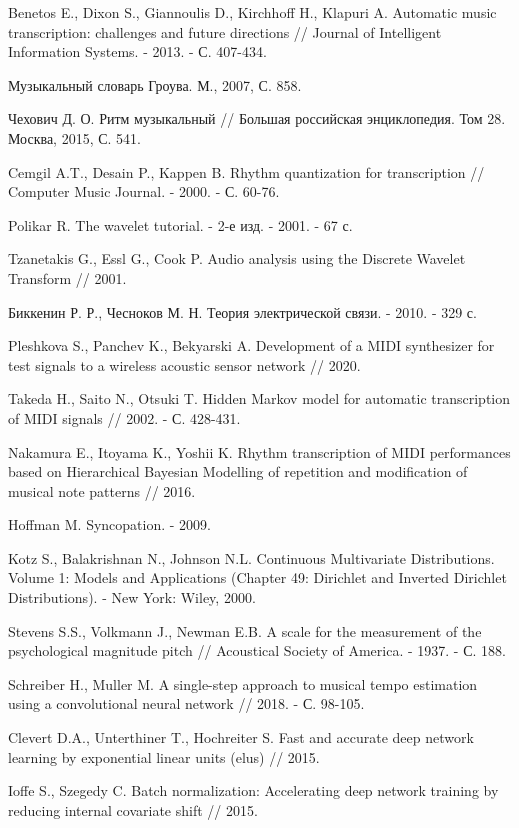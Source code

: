 
\begingroup
\renewcommand{\section}[2]{}
\begin{thebibliography}{}
	
Benetos E., Dixon S., Giannoulis D., Kirchhoff H., Klapuri A. Automatic music transcription: challenges and future directions // Journal of Intelligent Information Systems. - 2013. - С. 407-434.

Музыкальный словарь Гроува. М., 2007, С. 858.

Чехович Д. О. Ритм музыкальный // Большая российская энциклопедия. Том 28. Москва, 2015, С. 541.

Cemgil A.T., Desain P., Kappen B. Rhythm quantization for transcription // Computer Music Journal. - 2000. - С. 60-76.

Polikar R. The wavelet tutorial. - 2-е изд. - 2001. - 67 с.

Tzanetakis G., Essl G., Cook P. Audio analysis using the Discrete Wavelet Transform // 2001.

Биккенин Р. Р., Чесноков М. Н. Теория электрической связи. - 2010. - 329 с.

Pleshkova S., Panchev K., Bekyarski A. Development of a MIDI synthesizer for test signals to a wireless acoustic sensor network // 2020.

Takeda H., Saito N., Otsuki T. Hidden Markov model for automatic transcription of MIDI signals // 2002. - С. 428-431.

Nakamura E., Itoyama K., Yoshii K. Rhythm transcription of MIDI performances based on Hierarchical Bayesian Modelling of repetition and modification of musical note patterns // 2016.

Hoffman M. Syncopation. - 2009.

Kotz S., Balakrishnan N., Johnson N.L. Continuous Multivariate Distributions. Volume 1: Models and Applications (Chapter 49: Dirichlet and Inverted Dirichlet Distributions). - New York: Wiley, 2000.

Stevens S.S., Volkmann J., Newman E.B. A scale for the measurement of the psychological magnitude pitch // Acoustical Society of America. - 1937. - С. 188.

Schreiber H., Muller M. A single-step approach to musical tempo estimation using a convolutional neural network // 2018. - С. 98-105.

Clevert D.A., Unterthiner T., Hochreiter S. Fast and accurate deep network learning by exponential linear units (elus) // 2015.

Ioffe S., Szegedy C. Batch normalization: Accelerating deep network training by reducing internal covariate shift // 2015.

\end{thebibliography}
\endgroup